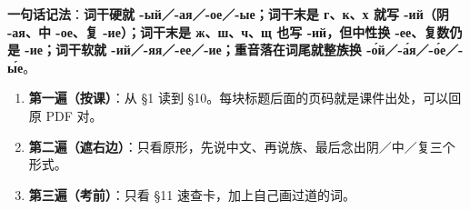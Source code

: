 \documentclass[11pt]{ctexart}
\begin{document}
\textbf{一句话记法}：\textbf{词干硬就 -ый／-ая／-ое／-ые；词干末是 г、к、х 就写 -ий（阴 -ая、中 -ое、复 -ие）；词干末是 ж、ш、ч、щ 也写 -ий，但中性换 -ее、复数仍是 -ие；词干软就 -ий／-яя／-ее／-ие；重音落在词尾就整族换 -о́й／-а́я／-о́е／-ы́е}。



\begin{enumerate}
\item \textbf{第一遍（按课）}：从 §1 读到 §10。每块标题后面的页码就是课件出处，可以回原 PDF 对。
\item \textbf{第二遍（遮右边）}：只看原形，先说中文、再说族、最后念出阴／中／复三个形式。
\item \textbf{第三遍（考前）}：只看 §11 速查卡，加上自己画过道的词。
\end{enumerate}
\end{document}
